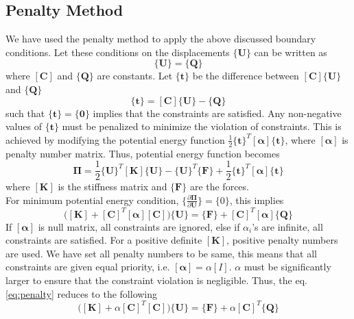 \documentclass[openright,twoside]{iitkthesis}
\newcommand{\e}[1]{\textbf{#1}}
\begin{document}
\subsection{Penalty Method}
\label{sec:pbc}
We have used the penalty method to apply the above discussed boundary conditions. Let these conditions on the displacements $\{\e U\}$ can be written as
\begin{equation*}
[\textbf{C}]\{\textbf{U}\} = \{\textbf{Q}\}
\end{equation*}
where $[\textbf{C}]$ and $\{\textbf{Q}\}$ are constants. Let $\{\textbf{t}\}$ be the difference between $[\textbf{C}]\{\textbf{U}\}$ and $\{\textbf{Q}\}$ 
\begin{equation*}
\{\textbf{t}\} = [\textbf{C}]\{\textbf{U}\} - \{\textbf{Q}\}
\end{equation*}
such that $\{\textbf{t}\} = \{\textbf{0}\}$ implies that the constraints are satisfied. Any non-negative values of $\{\textbf{t}\}$ must be penalized to minimize the violation of constraints. This is achieved by modifying the potential energy function\cite{cook2007concepts} $\frac{1}{2}\{\textbf{t}\}^T[\bm\alpha]\{\textbf{t}\}$, where $[\bm\alpha]$ is penalty number matrix. Thus, potential energy function becomes
\begin{equation}
\bm\Pi = \frac{1}{2}\{\e U\}^T[\e K]\{\e U\} - \{\e U\}^T\{\e F\} + \frac{1}{2}\{\textbf{t}\}^T[\bm\alpha]\{\textbf{t}\}
\end{equation}
where $[\e K]$ is the stiffness matrix and $\{\e F\}$ are the forces.\\
For minimum potential energy condition, $\{\frac{\partial\bm\Pi}{\partial\e U}\} = \{0\}$, this implies
\begin{equation}
\label{eq:penalty}
\bigg([\e K]+[\e C]^T[\bm\alpha][\e C]\bigg)\{\e U\} = \{\e F\} + [\e C]^T[\bm\alpha]\{\e Q\}
\end{equation}
If $[\bm\alpha]$ is null matrix, all constraints are ignored, else if $\alpha_i$'s are infinite, all constraints are satisfied. For a positive definite $[\e K]$, positive penalty numbers are used. We have set all penalty numbers to be same, this means that all constraints are given equal priority, i.e. $[\bm\alpha] = \alpha[I]$. $\alpha$ must be significantly larger to ensure that the constraint violation is negligible. Thus, the eq. \eqref{eq:penalty} reduces to the following
\begin{equation}
\label{eq:penalty1}
\bigg([\e K]+\alpha[\e C]^T[\e C]\bigg)\{\e U\} = \{\e F\} + \alpha[\e C]^T\{\e Q\}
\end{equation}
\end{document}
